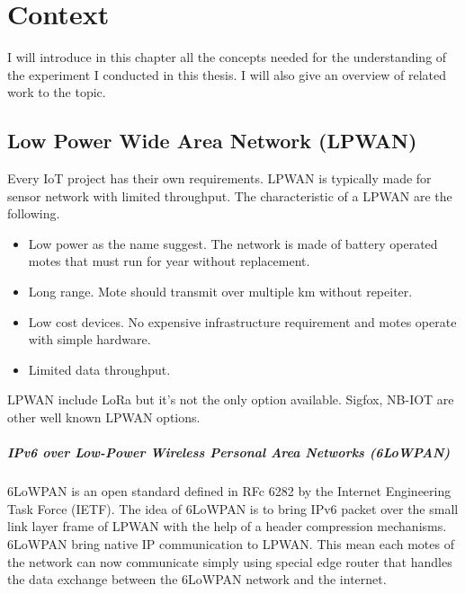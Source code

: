 \chapter{Context\label{section:context}}

I will introduce in this chapter all the concepts needed for the understanding
of the experiment I conducted in this thesis.
I will also give an overview of related work to the topic.

\section{Low Power Wide Area Network (LPWAN)\label{section:lpwan}}

Every IoT project has their own requirements. 
LPWAN is typically made for sensor network with limited throughput.
The characteristic of a LPWAN are the following.

\begin{itemize}
  \item Low power as the name suggest. The network is made of battery operated
    motes that must run for year without replacement.
  \item Long range. Mote should transmit over multiple km without repeiter.
  \item Low cost devices. No expensive infrastructure requirement and motes
    operate with simple hardware.
  \item Limited data throughput.
\end{itemize}

LPWAN include LoRa but it's not the only option available. 
Sigfox, NB-IOT are other well known LPWAN options.

\paragraph{IPv6 over Low-Power Wireless Personal Area Networks (6LoWPAN)}

6LoWPAN is an open standard defined in RFc 6282 by the Internet Engineering
Task Force (IETF).
The idea of 6LoWPAN is to bring IPv6 packet over the small link layer frame of
LPWAN with the help of a header compression mechanisms.
6LoWPAN bring native IP communication to LPWAN.
This mean each motes of the network can now communicate simply using special
edge router that handles the data exchange between the 6LoWPAN network and the
internet.

